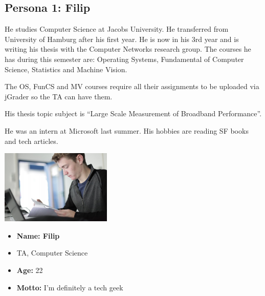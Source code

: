 \subsection{Persona 1: Filip}

He studies Computer Science at Jacobs University. He transferred from University of Hamburg after his first year. He is now in his 3rd year and is writing his thesis with the Computer Networks research group. The courses he has during this semester are: Operating Systems, Fundamental of Computer Science, Statistics and Machine Vision.

The OS, FunCS and MV courses require all their assignments to be uploaded via jGrader so the TA can have them.

His thesis topic subject is ``Large Scale Measurement of Broadband Performance''.

He was an intern at Microsoft last summer. His hobbies are reading SF books and tech articles.

\begin{center}
  \includegraphics[width=200px]{personas/filip.png}
\end{center}

\begin{itemize}
  \item \textbf{Name: Filip}
  \item TA, Computer Science
  \item \textbf{Age:} 22
  \item \textbf{Motto:} I'm definitely a tech geek
\end{itemize}
